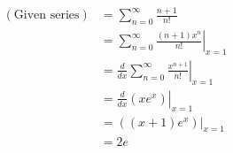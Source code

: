 \item

\begin{align*}
	(\text{Given series})
	&= \sum_{n = 0}^\infty \frac{n + 1}{n!} \\
	&= \left. \sum_{n = 0}^\infty \frac{(n + 1) x^n}{n!} \right|_{x = 1} \\
	&= \left. \frac{d}{dx} \sum_{n = 0}^\infty \frac{x^{n + 1}}{n!} \right|_{x = 1} \\
	&= \left. \frac{d}{dx} \left( xe^x \right) \right|_{x = 1} \\
	&= \left. \left( (x + 1) e^x \right) \right|_{x = 1} \\
	&= 2e
\end{align*}
